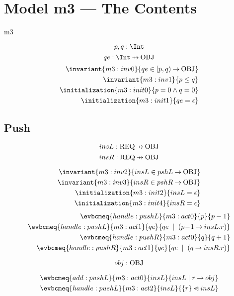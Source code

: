 \documentclass[12pt]{amsart}
\newcommand{\REQ}{\text{REQ}}
\begin{document}
\section{Model m3 --- The Contents}
  
\begin{machine}{m3}

  \newset{\OBJ} 
  \[ \variable{ p,q : \Int } \]
  \[ \variable{ qe : \Int \pfun \OBJ } \]
  \begin{align}
    \invariant{m3:inv0}{ qe \in \intervalR{p}{q} \tfun \OBJ } \\
    \invariant{m3:inv1}{ p \le q } \\
    \initialization{m3:init0}{ p = 0 \land q = 0} \\
    \initialization{m3:init1}{ qe = \emptyfun }
  \end{align}
  \subsection{Push}
    \[\variable{insL : \REQ \pfun \OBJ} \]
    \[\variable{insR : \REQ \pfun \OBJ} \]
  \begin{description}
  \end{description}
  \begin{align}
    \invariant{m3:inv2}{ insL \in pshL \tfun \OBJ } \\
    \invariant{m3:inv3}{ insR \in pshR \tfun \OBJ } \\
    \initialization{m3:init2}{ insL = \emptyfun } \\
    \initialization{m3:init4}{ insR = \emptyfun }
  \end{align}
  \begin{align}
    \evbcmeq{handle:pushL}{m3:act0}{p}{p - 1} \\
    \evbcmeq{handle:pushL}{m3:act1}{qe}{ qe \2| (p \0- 1 \fun insL.r)} \\
    \evbcmeq{handle:pushR}{m3:act0}{q}{q + 1} \\
    \evbcmeq{handle:pushR}{m3:act1}{qe}{ qe \2| (q \fun insR.r)} 
  \end{align}
  
  \[ \param{add:pushL}{ obj : \OBJ } \]

  \begin{align}
    \evbcmeq{add:pushL}{m3:act0}
      {insL}{ insL \1| r \fun obj } \\
    \evbcmeq{handle:pushL}{m3:act2}
      {insL}{ \{ r \} \domsub insL }
  \end{align}


\end{machine}
\end{document}
